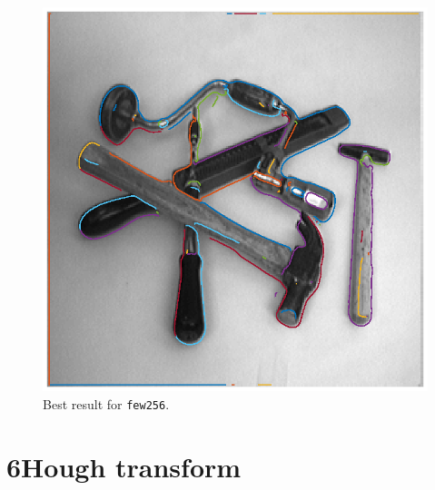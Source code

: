 \documentclass[11pt,a4paper]{article}
\begin{document}
\begin{itemize}
\begin{figure}[!ht]
				\includegraphics[width=0.9\columnwidth]{Question_7_Tools_Overlay_Curves.eps}
				\caption{Best result for \texttt{few256}.}
				\label{fig:Question_7_Tools_Overlay_Curves}
			\end{figure}
	\end{itemize}

\section*{6\hspace{0.5cm}Hough transform}
\end{document}
